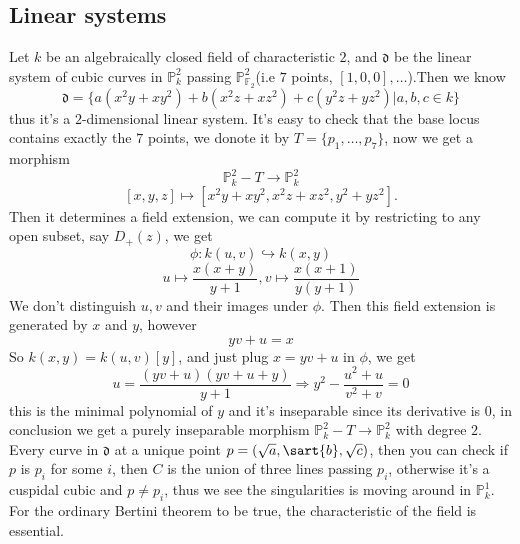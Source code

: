 \documentclass[../main.tex]{subfiles}
\begin{document}
\subsection{Linear systems}
\begin{example}
Let $k$ be an algebraically closed field of characteristic $2$, and $\mathfrak{d}$ be the linear system of cubic curves in $\mathbb{P}_{k}^{2}$ passing $\mathbb{P}_{\mathbb{F}_{2}}^{2}$(i.e $7$ points, $[1,0,0],\dots $).Then we know 
$$\mathfrak{d}=\{a(x^{2}y+xy^{2})+b(x^{2}z+xz^{2})+c(y^{2}z+yz^{2})|a,b,c\in k\}$$
thus it's a $2$-dimensional linear system. It's easy to check that the base locus contains exactly the $7$ points, we donote it by $T=\{p_{1},\dots, p_{7}\}$, now we get a morphism
$$\mathbb{P}_{k}^{2}-T\rightarrow \mathbb{P}_{k}^{2}$$
$$[x,y,z]\mapsto [x^{2}y+xy^{2},x^{2}z+xz^{2},y^{2}+yz^{2}].$$
Then it determines a field extension, we can compute it by restricting to any open subset, say $D_{+}(z)$, we get
$$\phi:k(u,v)\hookrightarrow k(x,y)$$
$$u\mapsto \frac{x(x+y)}{y+1}, v\mapsto \frac{x(x+1)}{y(y+1)}$$
We don't distinguish $u,v$ and their images under $\phi$. Then this field extension is generated by $x$ and $y$, however 
$$yv+u=x$$
So $k(x,y)=k(u,v)[y]$, and just plug $x=yv+u$ in $\phi$, we get 
$$u=\frac{(yv+u)(yv+u+y)}{y+1}\Rightarrow y^{2}-\frac{u^{2}+u}{v^{2}+v}=0$$
this is the minimal polynomial of $y$ and it's inseparable since its derivative is $0$, in conclusion we get a purely inseparable morphism $\mathbb{P}_{k}^{2}-T\rightarrow \mathbb{P}_{k}^{2}$ with degree $2$. Every curve in $\mathfrak{d}$ at a unique point $p=(\sqrt{a},\sart{b},\sqrt{c})$, then you can check if $p$ is $p_{i}$ for some $i$, then $C$ is the union of three lines passing $p_{i}$, otherwise it's a cuspidal cubic and $p\neq p_{i}$,  thus we see the singularities is moving around in $\mathbb{P}_{k}^{1}.$ For the ordinary Bertini theorem to be true, the characteristic of the field is essential.  
\end{example}
\end{document}
